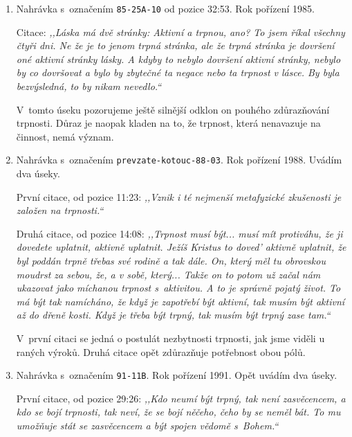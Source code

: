 \begin{enumerate}
{      Jako v~předchozím úseku je důraz kladen na nalezení mezí aktivity a
      pasivity a navíc na legitimitu obou pólů.
  }
  \item{
      Nahrávka s~označením \texttt{85-25A-10} od pozice 32:53. Rok pořízení 1985.

      Citace: \textit{%
        ,,Láska má dvě stránky: Aktivní a trpnou, ano? To jsem říkal všechny
        čtyři dni. Ne že je to jenom trpná stránka, ale že trpná stránka je
        dovršení oné aktivní stránky lásky. A kdyby to nebylo dovršení aktivní
        stránky, nebylo by co dovršovat a bylo by zbytečné ta negace nebo ta
        trpnost v lásce. By byla bezvýsledná, to by nikam nevedlo.``
      }

      V~tomto úseku pozorujeme ještě silnější odklon on pouhého zdůrazňování
      trpnosti. Důraz je naopak kladen na to, že trpnost, která nenavazuje na
      činnost, nemá význam.
  }
  \item{
      Nahrávka s~označením \texttt{prevzate-kotouc-88-03}. Rok pořízení 1988.
      Uvádím dva úseky.

      První citace, od pozice 11:23: \textit{%
        ,,Vznik i té nejmenší metafyzické zkušenosti je založen na trpnosti.``
      }

      Druhá citace, od pozice 14:08: \textit{%
        ,,Trpnost musí být... musí mít protiváhu, že ji dovedete uplatnit, aktivně
        uplatnit. Ježíš Kristus to doved' aktivně uplatnit, že byl poddán trpně
        třebas své rodině a tak dále. On, který měl tu obrovskou moudrst za
        sebou, že, a v sobě, který... Takže on to potom už začal nám ukazovat
        jako míchanou trpnost s~aktivitou. A to je správně pojatý život. To má
        být tak namícháno, že když je zapotřebí být aktivní, tak musím být
        aktivní až do dřeně kosti. Když je třeba být trpný, tak musím být trpný
        zase tam.``
      }

      V~první citaci se jedná o postulát nezbytnosti trpnosti, jak jsme viděli u
      raných výroků. Druhá citace opět zdůrazňuje potřebnost obou pólů.
  }
  \item{
      Nahrávka s~označením \texttt{91-11B}. Rok pořízení 1991. Opět uvádím dva
      úseky.

      První citace, od pozice 29:26: \textit{%
        ,,Kdo neumí být trpný, tak není zasvěcencem, a kdo se bojí trpnosti, tak
        neví, že se bojí něčeho, čeho by se neměl bát. To mu umožňuje stát se
        zasvěcencem a být spojen vědomě s~Bohem.``
      }

}
\end{enumerate}
